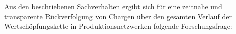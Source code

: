 




Aus den beschriebenen Sachverhalten ergibt sich für eine zeitnahe und transparente Rückverfolgung von Chargen über den gesamten Verlauf der Wertschöpfungskette in Produktionsnetzwerken folgende Forschungsfrage:


